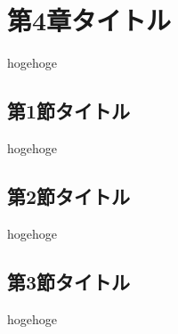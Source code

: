 \chapter{第4章タイトル}
hogehoge

  \section{第1節タイトル}
  hogehoge

  \section{第2節タイトル}
  hogehoge

  \section{第3節タイトル}
  hogehoge
